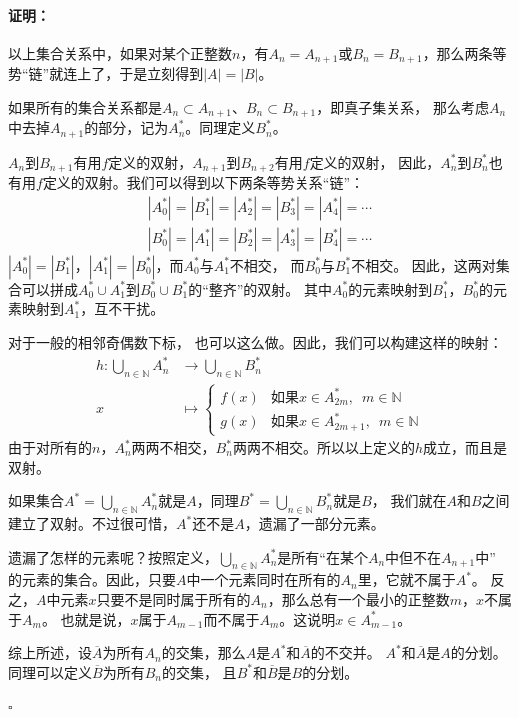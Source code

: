 \documentclass[12pt,UTF8]{ctexbook}
\renewenvironment{proof}{\paragraph{\textbf{证明：}}}{\hfill$\square$}
\begin{document}
\begin{appendix}
\begin{proof}
    以上集合关系中，如果对某个正整数$n$，有$A_n = A_{n+1}$或$B_n = B_{n+1}$，那么两条等势“链”就连上了，于是立刻得到$|A| = |B|$。

    如果所有的集合关系都是$A_n \subset A_{n+1}$、$B_n \subset B_{n+1}$，即真子集关系，
    那么考虑$A_n$中去掉$A_{n+1}$的部分，记为$A_n^*$。同理定义$B_n^*$。
    
    $A_n$到$B_{n+1}$有用$f$定义的双射，$A_{n+1}$到$B_{n+2}$有用$f$定义的双射，
    因此，$A_n^*$到$B_n^*$也有用$f$定义的双射。我们可以得到以下两条等势关系“链”：
    \begin{align*}
        |A_0^*| = |B_1^*| = |A_2^*| = |B_3^*| = |A_4^*| = \cdots  \\
        |B_0^*| = |A_1^*| = |B_2^*| = |A_3^*| = |B_4^*| = \cdots   
    \end{align*}
    $|A_0^*| = |B_1^*|$，$|A_1^*| = |B_0^*|$，而$A_0^*$与$A_1^*$不相交，
    而$B_0^*$与$B_1^*$不相交。
    因此，这两对集合可以拼成$A_0^* \cup A_1^*$到$B_0^* \cup B_1^*$的“整齐”的双射。
    其中$A_0^*$的元素映射到$B_1^*$，$B_0^*$的元素映射到$A_1^*$，互不干扰。
    
    对于一般的相邻奇偶数下标，
    也可以这么做。因此，我们可以构建这样的映射：
    \begin{align*}
        h : \bigcup_{n\in\mathbb{N}} A_n^* &\rightarrow \bigcup_{n\in\mathbb{N}} B_n^*  \\
        x \quad&\mapsto \left\{ \begin{array}{ll}
            f(x) & \mbox{如果} x\in A_{2m}^*,\,\,\, m\in\mathbb{N}  \\
            g(x) & \mbox{如果} x\in A_{2m+1}^*,\,\,\, m\in\mathbb{N} 
        \end{array} \right.
    \end{align*}
    由于对所有的$n$，$A_n^*$两两不相交，$B_n^*$两两不相交。所以以上定义的$h$成立，而且是双射。

    如果集合$A^* = \bigcup_{n\in\mathbb{N}} A_n^*$就是$A$，同理$B^* = \bigcup_{n\in\mathbb{N}} B_n^*$就是$B$，
    我们就在$A$和$B$之间建立了双射。不过很可惜，$A^*$还不是$A$，遗漏了一部分元素。

    遗漏了怎样的元素呢？按照定义，$\bigcup_{n\in\mathbb{N}} A_n^*$是所有“在某个$A_n$中但不在$A_{n+1}$中”
    的元素的集合。因此，只要$A$中一个元素同时在所有的$A_n$里，它就不属于$A^*$。
    反之，$A$中元素$x$只要不是同时属于所有的$A_n$，那么总有一个最小的正整数$m$，$x$不属于$A_m$。
    也就是说，$x$属于$A_{m-1}$而不属于$A_m$。这说明$x\in A_{m-1}^*$。

    综上所述，设$\overline{A}$为所有$A_n$的交集，那么$A$是$A^*$和$\overline{A}$的不交并。
    $A^*$和$\overline{A}$是$A$的分划。同理可以定义$\overline{B}$为所有$B_n$的交集，
    且$B^*$和$\overline{B}$是$B$的分划。


\end{proof}
\end{appendix}
\end{document}
